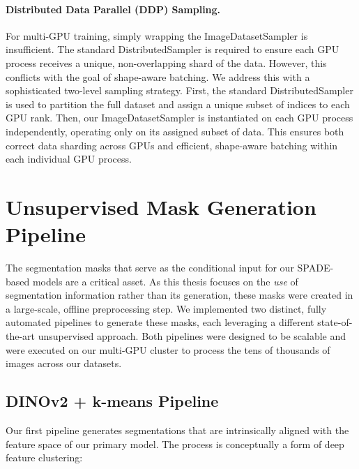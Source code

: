 \paragraph{Distributed Data Parallel (DDP) Sampling.}
For multi-GPU training, simply wrapping the ImageDatasetSampler is insufficient. The standard DistributedSampler is required to ensure each GPU process receives a unique, non-overlapping shard of the data. However, this conflicts with the goal of shape-aware batching.
We address this with a sophisticated two-level sampling strategy. First, the standard DistributedSampler is used to partition the full dataset and assign a unique subset of indices to each GPU rank. Then, our ImageDatasetSampler is instantiated on each GPU process independently, operating only on its assigned subset of data. This ensures both correct data sharding across GPUs and efficient, shape-aware batching within each individual GPU process.


\section{Unsupervised Mask Generation Pipeline}
\label{sec:impl_mask_generation}

The segmentation masks that serve as the conditional input for our SPADE-based models are a critical asset. As this thesis focuses on the \textit{use} of segmentation information rather than its generation, these masks were created in a large-scale, offline preprocessing step. We implemented two distinct, fully automated pipelines to generate these masks, each leveraging a different state-of-the-art unsupervised approach. Both pipelines were designed to be scalable and were executed on our multi-GPU cluster to process the tens of thousands of images across our datasets.

\subsection{DINOv2 + k-means Pipeline}
Our first pipeline generates segmentations that are intrinsically aligned with the feature space of our primary model. The process is conceptually a form of deep feature clustering:

